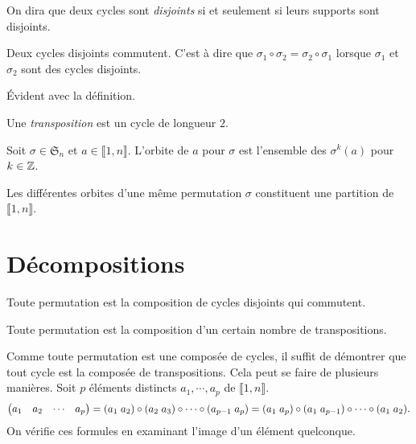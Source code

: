 \begin{defi}
 On dira que deux cycles sont \emph{disjoints} si et seulement si leurs supports sont disjoints.
\end{defi}
\begin{propn}
 Deux cycles disjoints commutent. C'est à dire que $\sigma_1 \circ \sigma_2 = \sigma_2 \circ \sigma_1 $ lorsque $\sigma_1$ et $\sigma_2$ sont des cycles disjoints.
\end{propn}
\begin{demo}
 \'Evident avec la définition.
\end{demo}
\begin{defi}
Une \emph{transposition} est un cycle de longueur $2$. 
\end{defi}
\begin{defi}
Soit $\sigma \in \mathfrak{S}_n$ et $a\in \llbracket 1,n \rrbracket$. L'orbite de $a$ pour $\sigma$ est l'ensemble des $\sigma^k(a)$ pour $k\in \mathbb{Z}$.  
\end{defi}
\begin{propn}
  Les différentes orbites d'une même permutation $\sigma$ constituent une partition de $\llbracket 1,n \rrbracket$.
\end{propn}


\section{Décompositions}
\begin{propn} \label{prop:decompcycl}
 Toute permutation est la composition de cycles disjoints qui commutent.
\end{propn}
\begin{propn}\label{prop:decomptranspo}
 Toute permutation est la composition d'un certain nombre de transpositions.
\end{propn}
\begin{demo}
 Comme toute permutation est une composée de cycles, il suffit de démontrer que tout cycle est la composée de transpositions. Cela peut se faire de plusieurs manières.\newline
Soit $p$ éléments distincts $a_1,\cdots,a_p$ de $\llbracket 1, n\rrbracket$.
\[
 \begin{pmatrix}
  a_1 & a_2 & \cdots & a_p
 \end{pmatrix}
 = (a_1\; a_2)\circ (a_2\; a_3)\circ \cdots \circ (a_{p-1}\; a_p) \\
 = (a_1\;a_p)\circ(a_1\;a_{p-1})\circ\cdots\circ (a_1\;a_2).
\]
On vérifie ces formules en examinant l'image d'un élément quelconque.
\end{demo}

